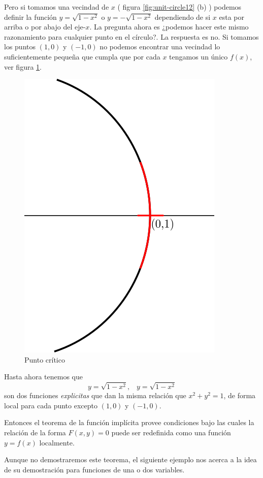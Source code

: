 \begin{example}
    Pero si tomamos una vecindad de $x$ ( figura \ref{fig:unit-circle12} (b) )
    podemos definir la funci\'on $y = \sqrt{1-x^{2}}$ o $y = -\sqrt{1-x^{2}}$
    dependiendo de si $x$ esta por arriba o por abajo del eje-$x$. La
    pregunta ahora es ¿podemos hacer este mismo razonamiento para cualquier
    punto en el c\'irculo?. La respuesta es no. Si tomamos los puntos
    $(1,0)$ y $(-1,0)$ no podemos encontrar una vecindad lo suficientemente
    pequeña que cumpla que por cada $x$ tengamos un \'unico $f(x)$, ver
    figura \ref{fig:unit-circle3}.

    \begin{figure}[ht]
      \begin{center}
      \includegraphics[width=0.5\linewidth]{gfx/unit-circle3}
        \caption{Punto cr\'itico}
      \label{fig:unit-circle3}
      \end{center}
    \end{figure}



    Hasta ahora tenemos que
    $$y = \sqrt{1-x^{2}} \text{,} \quad y = \sqrt{1-x^{2}}$$
    son dos funciones \emph{explicitas} que dan la misma relaci\'on que
    $x^{2} + y^{2} = 1$, de forma local para cada punto excepto 
    $(1,0)$ y $(-1,0)$.

    Entonces el teorema de la funci\'on impl\'icita provee condiciones
    bajo las cuales la relaci\'on de la forma $F(x,y)=0$ puede ser
    redefinida como una funci\'on $y=f(x)$ localmente.
\end{example}

Aunque no demostraremos este teorema, el siguiente ejemplo nos acerca a la
idea de su demostraci\'on para funciones de una o dos variables.

